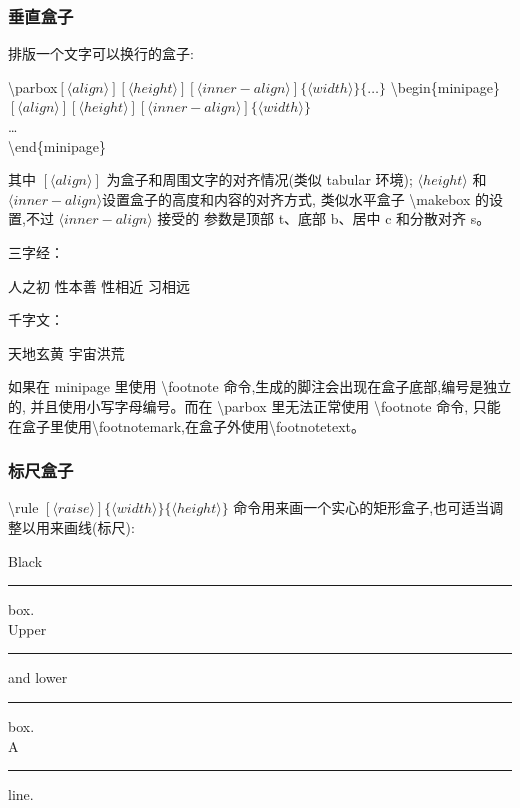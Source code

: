 \documentclass[a4paper]{ctexart}
\begin{document}
    \subsubsection{垂直盒子}
    排版一个文字可以换行的盒子:\par
    \textbackslash parbox$[\langle align\rangle][\langle height\rangle][\langle inner-align\rangle]\{\langle width\rangle\}\{\ldots \}$
    \textbackslash begin\{minipage\}$[\langle align\rangle][\langle height\rangle][\langle inner-align\rangle]\{\langle width\rangle\}$\\
    \ldots\\
    \textbackslash end\{minipage\}\par
    其中 $[\langle align\rangle]$ 为盒子和周围文字的对齐情况(类似 tabular 环境); %
    $\langle height\rangle$ 和 $\langle inner-align\rangle$设置盒子的高度和内容的对齐方式,%
    类似水平盒子 \textbackslash makebox 的设置,不过 $\langle inner-align\rangle$ 接受的%
    参数是顶部 t、底部 b、居中 c 和分散对齐 s。\par
    三字经：\parbox[t]{3em}{人之初 性本善 性相近 习相远}
    \quad
    千字文：
    \begin{minipage}[b][8ex][t]{4em}
        天地玄黄 宇宙洪荒
    \end{minipage}\par
    如果在 minipage 里使用 \textbackslash footnote 命令,生成的脚注会出现在盒子底部,编号是独立的, %
    并且使用小写字母编号。而在 \textbackslash parbox 里无法正常使用 \textbackslash footnote 命令,%
    只能在盒子里使用\textbackslash footnotemark,在盒子外使用\textbackslash footnotetext。\par
    \par
    \subsubsection{标尺盒子}
    \textbackslash rule $[\langle raise\rangle]\{\langle width\rangle\}\{\langle height\rangle\}$%
    命令用来画一个实心的矩形盒子,也可适当调整以用来画线(标尺):\par
    Black \rule{12pt}{4pt} box.\\
    Upper \rule[4pt]{6pt}{8pt} and lower \rule[-4pt]{6pt}{8pt} box.\\
    A \rule[-.4pt]{6pt}{.4pt} line.\par
\end{document}
